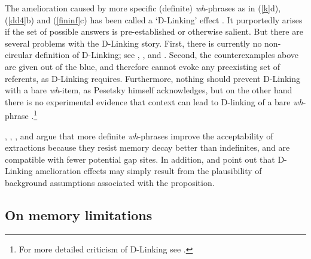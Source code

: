 \documentclass[output=paper
 	        ,biblatex
                ,babelshorthands
                ,newtxmath
                ,draftmode
                ,colorlinks, citecolor=brown
]{langscibook}
\begin{document}
The amelioration caused by more specific (definite) \emph{wh}-phrases as in  (\ref{k}d), (\ref{dd4}b) and (\ref{fininf}c)  has been called a `D-Linking' effect  \citep{pesetskydlink,pesetskybook}. It purportedly arises if the set of possible answers is pre-established or otherwise salient. But there are several problems with the D-Linking story.   First, there is currently no non-circular definition of D-Linking; see 
\citet[16]{pesetskybook},
 \citet[247--250]{ginzsag}, 
 \citet[33, 39]{chung94} and
\citet[242, 268--271]{levhubook}. Second, the counterexamples above are given out of the blue, and therefore cannot evoke any preexisting set of referents, as D-Linking 
requires.   Furthermore, nothing should prevent D-Linking with a bare \emph{wh}-item, as Pesetsky himself acknowledges, but on the other hand there is no experimental evidence that context can lead to D-linking of a bare \emph{wh}-phrase \citep{sprousediss07,villata}.\footnote{For more detailed criticism of D-Linking see \citet{hof2007}.}

 \citet{kluenderkustas}, \citet{saghof}, \citet{philcls}, \citet{philipt07} and \citet{hofsaglang} argue that more definite \emph{wh}-phrases improve the  acceptability of  extractions because they resist memory decay better than indefinites, and 
 are compatible with fewer potential gap sites. In addition, \citet{kroch89} and \citet[270]{levhubook} point out that D-Linking amelioration effects  may simply result from  the plausibility of background assumptions associated with the proposition. 

\subsection{On memory limitations}
 
\end{document}
